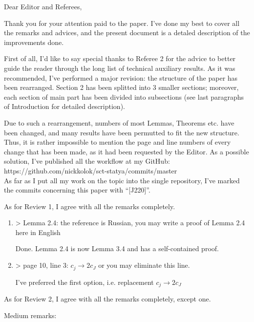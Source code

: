 \documentclass[a4paper,14pt]{article} %
\begin{document}
Dear Editor and Referees,

Thank you for your attention paid to the paper.
I've done my best to cover all the remarks and advices,
and the present document is a detaled description of the improvements done.

First of all, I'd like to say special thanks to Referee 2 for the advice
to better guide the reader through the long list of technical auxiliary results.
As it was recommended, I've performed a major revision:
the structure of the paper has been rearranged.
Section 2 has been splitted into 3 smaller sections;
moreover, each section of main part has been divided into subsections
(see last paragraphs of Introduction for detailed description).

Due to such a rearrangement, numbers of most Lemmas, Theorems etc. have been changed,
and many results have been permutted to fit the new structure.
Thus, it is rather impossible to mention the page and line numbers of every change that has been made,
as it had been requested by the Editor.
As a possible solution, I've published all the workflow at my GitHub:
\\
https://github.com/nickkolok/sct-statya/commits/master
\\
As far as I put all my work on the topic into the single repository,
I've marked the commits concerning this paper with ``[J220]''.

As for Review 1, I agree with all the remarks completely.
\begin{enumerate}
	\item
		> Lemma 2.4: the reference is Russian, you may write a proof of Lemma 2.4 here in English

		Done. Lemma 2.4 is now Lemma 3.4 and has a self-contained proof.

	\item

		> page 10, line 3: $c_j \rightarrow 2c_J$ or you may eliminate this line.

		I've preferred the first option, i.e. replacement $c_j \rightarrow 2c_J$
\end{enumerate}

As for Review 2, I agree with all the remarks completely, except one.

Medium remarks:
\end{document}
